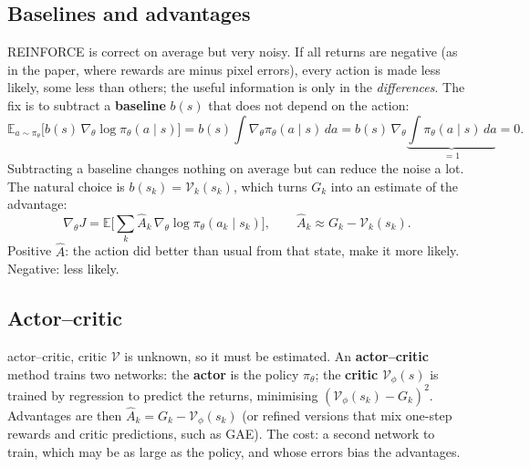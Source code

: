 \documentclass[11pt,a4paper]{article}
\newcommand{\E}{\mathbb{E}}
\newcommand{\Vf}{\mathcal{V}}
\begin{document}
\subsection{Baselines and advantages}
REINFORCE is correct on average but very noisy. If all returns are negative (as in the paper, where rewards are minus pixel errors), every action is made less likely, some less than others; the useful information is only in the \emph{differences}. The fix is to subtract a \textbf{baseline} $b(s)$ that does not depend on the action:
\begin{equation}
\E_{a\sim\pi_\theta}\big[b(s)\,\nabla_\theta\log\pi_\theta(a\mid s)\big]
=b(s)\int\nabla_\theta\pi_\theta(a\mid s)\,da=b(s)\,\nabla_\theta\underbrace{\int\pi_\theta(a\mid s)\,da}_{=1}=0 .
\end{equation}
Subtracting a baseline changes nothing on average but can reduce the noise a lot. The natural choice is $b(s_k)=\Vf_k(s_k)$, which turns $G_k$ into an estimate of the advantage:
\begin{equation}
\nabla_\theta J=\E\Big[\sum_k\hat A_k\,\nabla_\theta\log\pi_\theta(a_k\mid s_k)\Big],\qquad\hat A_k\approx G_k-\Vf_k(s_k).
\label{eq:pg-adv}
\end{equation}
Positive $\hat A$: the action did better than usual from that state, make it more likely. Negative: less likely.

\subsection{Actor--critic}
\begin{newc}{actor--critic, critic}
$\Vf$ is unknown, so it must be estimated. An \textbf{actor--critic} method trains two networks: the \textbf{actor} is the policy $\pi_\theta$; the \textbf{critic} $\Vf_\phi(s)$ is trained by regression to predict the returns, minimising $(\Vf_\phi(s_k)-G_k)^2$. Advantages are then $\hat A_k=G_k-\Vf_\phi(s_k)$ (or refined versions that mix one-step rewards and critic predictions, such as GAE). The cost: a second network to train, which may be as large as the policy, and whose errors bias the advantages.
\end{newc}
\end{document}
